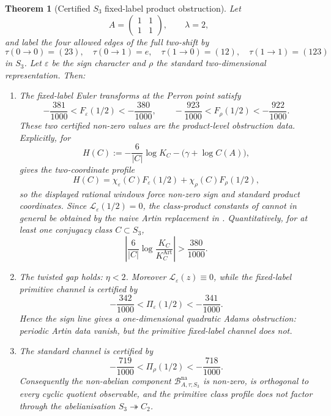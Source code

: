\documentclass[11pt,a4paper]{amsart}
\theoremstyle{plain}
\newtheorem{theorem}{Theorem}[section]
\theoremstyle{definition}
\theoremstyle{remark}
\begin{document}
\begin{theorem}[Certified \(S_3\) fixed-label product obstruction]
  \label{thm:s3-certified-nonabelian-defect}
  Let
  \[
    A=
    \begin{pmatrix}1&1\\1&1\end{pmatrix},
    \qquad \lambda=2,
  \]
  and label the four allowed edges of the full two-shift by
  \[
    \tau(0\to0)=(23),\quad \tau(0\to1)=e,
    \quad \tau(1\to0)=(12),\quad \tau(1\to1)=(123)
  \]
  in \(S_3\).  Let \(\varepsilon\) be the sign character and \(\rho\) the
  standard two-dimensional representation.  Then:
  \begin{enumerate}[label=\textup{(\roman*)}]
    \item The fixed-label Euler transforms at the Perron point satisfy
      \[
        -\frac{381}{1000}<F_\varepsilon(1/2)<-\frac{380}{1000},
        \qquad
        -\frac{923}{1000}<F_\rho(1/2)<-\frac{922}{1000}.
      \]
      These two certified non-zero values are the product-level
      obstruction data.  Explicitly, for
      \[
        H(C):=-\frac{6}{|C|}\log K_C-\bigl(\gamma+\log C(A)\bigr),
      \]
       gives the two-coordinate
      profile
      \[
        H(C)=\chi_\varepsilon(C)F_\varepsilon(1/2)
          +\chi_\rho(C)F_\rho(1/2),
      \]
      so the displayed rational windows force non-zero sign and standard
      product coordinates.  Since \(\mathcal L_\varepsilon(1/2)=0\), the
      class-product constants of
       cannot in general be obtained
      by the naive Artin replacement in
      .  Quantitatively, for at
      least one conjugacy class \(C\subset S_3\),
      \[
        \left|
          \frac{6}{|C|}
          \log\frac{K_C}{K_C^{\mathrm{Art}}}
        \right|
        >\frac{380}{1000}.
      \]
    \item The twisted gap holds: \(\eta<2\).  Moreover
      \(\mathcal L_\varepsilon(z)\equiv0\), while the fixed-label
      primitive channel is certified by
      \[
        -\frac{342}{1000}
        <\Pi_\varepsilon(1/2)<-\frac{341}{1000}.
      \]
      Hence the sign line gives a one-dimensional quadratic Adams
      obstruction: periodic Artin data vanish, but the primitive
      fixed-label channel does not.
    \item The standard channel is certified by
      \[
        -\frac{719}{1000}
        <\Pi_\rho(1/2)<-\frac{718}{1000}.
      \]
      Consequently the non-abelian component
      \(\mathcal B_{A,\tau;S_3}^{\mathrm{na}}\) is non-zero, is
      orthogonal to every cyclic quotient observable, and the primitive
      class profile does not factor through the abelianisation
      \(S_3\twoheadrightarrow C_2\).
  \end{enumerate}
\end{theorem}
\end{document}
